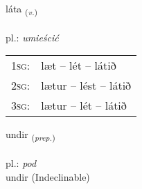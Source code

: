 \documentclass[frontgrid, backgrid]{flacards}\usepackage[]{graphicx}\usepackage[]{xcolor}
\begin{document}
{láta \small{\textsubscript{(\textit{v.})}} \\[1ex] %
\textphonetic{[lauːta]} \\
pl.: \emph{umieścić} \\  [2ex]
\renewcommand*{\arraystretch}{0.8}
\begin{tabular}{p{1cm}l}
\textsc{1sg}: & læt -- lét -- látið \\ 
\textsc{2sg}: & lætur -- lést -- látið \\ 
\textsc{3sg}: & lætur -- lét -- látið \\ 
\end{tabular}
}


\renewcommand{\flhead}{\vskip5pt \fboxsep=0pt {\small\bfseries\footnotesize Forsetning | przyimek}}
\renewcommand{\fcfoot}{\vskip5pt \fboxsep=0pt \hspace{2pt}{\small\bfseries\footnotesize 1K}}

\renewcommand{\blhead}{\vskip5pt {\small\bfseries\footnotesize Forsetning | przyimek }}
\renewcommand{\bcfoot}{\vskip5pt \hspace{2pt}{\small\bfseries\footnotesize 1K}}


{undir \small{\textsubscript{(\textit{prep.})}} \\[1ex]
\textphonetic{[ʏntɪr]} \\
pl.: \emph{pod} \\  [2ex]
undir (Indeclinable)}

\renewcommand{\flhead}{\vskip5pt \fboxsep=0pt {\small\bfseries\footnotesize Sagnorð | czasownik}}
\renewcommand{\fcfoot}{\vskip5pt \fboxsep=0pt \hspace{2pt}{\small\bfseries\footnotesize 1K}}

\renewcommand{\blhead}{\vskip5pt {\small\bfseries\footnotesize Sagnorð | czasownik }}
\renewcommand{\bcfoot}{\vskip5pt \hspace{2pt}{\small\bfseries\footnotesize 1K}}
\end{document}
